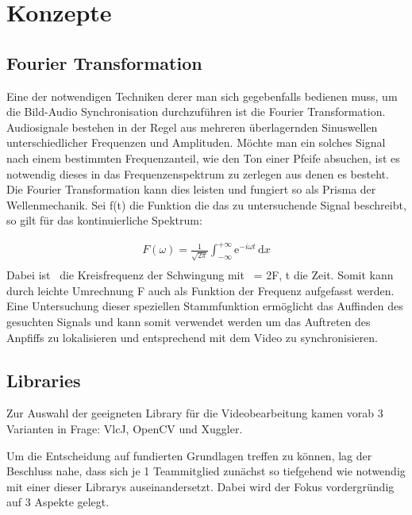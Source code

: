 \chapter{Konzepte}
\section{Fourier Transformation}
Eine der notwendigen Techniken derer man sich gegebenfalls bedienen muss, um die Bild-Audio Synchronisation durchzuführen ist die Fourier Transformation. Audiosignale bestehen in der Regel aus mehreren überlagernden Sinuswellen unterschiedlicher Frequenzen und Amplituden. Möchte man ein solches Signal nach einem bestimmten Frequenzanteil, wie den Ton einer Pfeife absuchen, ist es notwendig dieses in das Frequenzenspektrum zu zerlegen aus denen es besteht. Die Fourier Transformation kann dies leisten und fungiert so als Prisma der Wellenmechanik. Sei f(t) die Funktion die das zu untersuchende Signal beschreibt, so gilt für das kontinuierliche Spektrum:

\begin{align*}
F(\omega) = \frac{1}{\sqrt{2\pi}} \int^{+\infty}_{-\infty}\mathrm{e}^{-i\omega t}\,\mathrm{d}x\\
\end{align*}
Dabei ist \omega\, die Kreisfrequenz der Schwingung mit \omega\, = 2\cdot \pi \cdot F, t die Zeit. Somit kann durch leichte Umrechnung F auch als Funktion der Frequenz aufgefasst werden. Eine Untersuchung dieser speziellen Stammfunktion ermöglicht das Auffinden des gesuchten Signals und kann somit verwendet werden um das Auftreten des Anpfiffs zu lokalisieren und entsprechend mit dem Video zu synchronisieren. \cite{fourier}


\section{Libraries}
Zur Auswahl der geeigneten Library für die Videobearbeitung kamen vorab 3 Varianten in Frage: VlcJ, OpenCV und Xuggler.

Um die Entscheidung auf fundierten Grundlagen treffen zu können, lag der Beschluss nahe, dass sich je 1 Teammitglied zunächst so tiefgehend wie notwendig mit einer dieser Librarys auseinandersetzt. Dabei wird der Fokus vordergründig auf 3 Aspekte gelegt.

